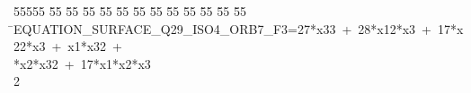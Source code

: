 %
%
\begin{tabbing}
55555 \= 55 \= 55 \= 55 \= 55 \= 55 \= 55 \= 55 \= 55 \= 55 \= 55 \= 55 \= 55 \= \>EQUATION\_SURFACE\_Q29\_ISO4\_ORB7\_F3=27*x33\ +\ 28*x12*x3\ +\ 17*x22*x3\ +\ x1*x32\ +\ \\[0pt]
*x2*x32\ +\ 17*x1*x2*x3\\[0pt]
2\>\end{tabbing}
